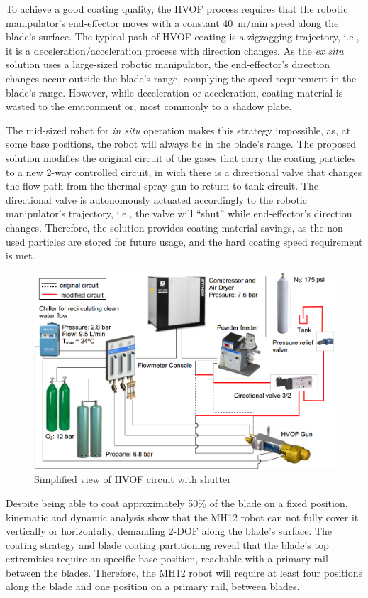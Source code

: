 To achieve a good coating quality, the HVOF process requires that the robotic
manipulator's end-effector moves with a constant 40~m/min speed along the
blade's surface. The typical path of HVOF coating is a zigzagging trajectory,
i.e., it is a deceleration/acceleration process with direction changes. As the
\textit{ex situ} solution uses a large-sized robotic manipulator, the
end-effector's direction changes occur outside the blade's range, complying the
speed requirement in the blade's range. However, while deceleration or
acceleration, coating material is wasted to the environment or, most commonly
to a shadow plate.

The mid-sized robot for \textit{in situ} operation makes this strategy
impossible, as, at some base positions, the robot will always be in the blade's
range. The proposed solution modifies the original circuit of the gases that
carry the coating particles to a new 2-way controlled circuit, in wich there is a directional
valve that changes the flow path from the thermal spray gun to return to tank
circuit. %
The directional valve is autonomously actuated accordingly to the robotic
manipulator's trajectory, i.e., the valve will ``shut'' while end-effector's
direction changes. Therefore, the solution provides coating material savings,
as the non-used particles are stored for future usage, and the hard coating
speed requirement is met.

\begin{figure}[h!]
   \centering
   \includegraphics[width=0.9\columnwidth]{figs/mecanica/Circuito_HVOF_mod_en.PNG}
   \caption{Simplified view of HVOF circuit with shutter}
   \label{fig::circuito_hvof}
\end{figure}

Despite being able to coat approximately 50\% of the blade on a fixed
position, kinematic and dynamic analysis show that the MH12 robot can not fully
cover it vertically or horizontally, demanding 2-DOF along the blade's surface.
The coating strategy and blade coating partitioning reveal that the blade's top
extremities require an specific base position, reachable
with a primary rail between the blades. Therefore, the MH12 robot will require
at least four positions along the blade and one position on a primary
rail, between blades. 

